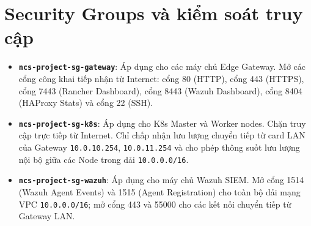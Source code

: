 \section{Security Groups và kiểm soát truy cập}
\begin{itemize}
    \item \textbf{\texttt{ncs-project-sg-gateway}}: Áp dụng cho các máy chủ Edge Gateway. Mở các cổng công khai tiếp nhận từ Internet: cổng 80 (HTTP), cổng 443 (HTTPS), cổng 7443 (Rancher Dashboard), cổng 8443 (Wazuh Dashboard), cổng 8404 (HAProxy Stats) và cổng 22 (SSH).
    \item \textbf{\texttt{ncs-project-sg-k8s}}: Áp dụng cho K8s Master và Worker nodes. Chặn truy cập trực tiếp từ Internet. Chỉ chấp nhận lưu lượng chuyển tiếp từ card LAN của Gateway \texttt{10.0.10.254}, \texttt{10.0.11.254} và cho phép thông suốt lưu lượng nội bộ giữa các Node trong dải \texttt{10.0.0.0/16}.
    \item \textbf{\texttt{ncs-project-sg-wazuh}}: Áp dụng cho máy chủ Wazuh SIEM. Mở cổng 1514 (Wazuh Agent Events) và 1515 (Agent Registration) cho toàn bộ dải mạng VPC \texttt{10.0.0.0/16}; mở cổng 443 và 55000 cho các kết nối chuyển tiếp từ Gateway LAN.
\end{itemize}

